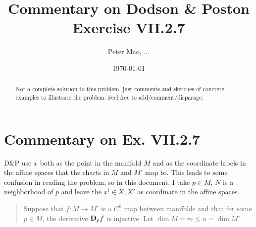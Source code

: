 \documentclass[11pt]{article}
\title{Commentary on Dodson \& Poston Exercise VII.2.7}
\author{Peter Mao, $\ldots$}
\date{\today}
\begin{document}
\maketitle
\pagestyle{empty}

\begin{abstract}
  Not a complete solution to this problem, just comments and sketches of concrete
  examples to illustrate the problem.  Feel free to add/comment/disparage.
\end{abstract}

\section{Commentary on Ex. VII.2.7}
D\&P use $x$ both as the point in the manifold $M$ and as the coordinate labels
in the affine spaces that the charts in $M$ and $M'$ map to.  This leads to some
confusion in reading the problem, so in this document, I take $p \in M$, $N$ is
a neighborhood of $p$ and leave the $x^i \in X, X'$ as coordinate in the affine
spaces.

\begin{quote}
  Suppose that $f \colon M \rightarrow M'$ is a $C^k$ map between manifolds and
  that for some $p \in M$, the derivative ${\bf D}_pf$ is injective.  Let $\dim M
  = m \le n = \dim M'$.
\end{quote}
\end{document}
